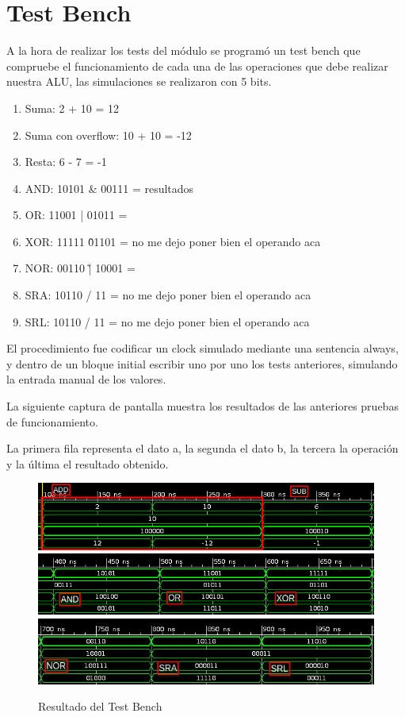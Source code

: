 \documentclass[a4paper]{article}
\begin{document}
\section{Test Bench}

A la hora de realizar los tests del módulo se programó un test bench que compruebe el funcionamiento de cada una de las operaciones que debe realizar nuestra ALU, las simulaciones se realizaron con 5 bits.

\begin{enumerate}
\item Suma: 2 + 10 = 12
\item Suma con overflow: 10 + 10 = -12
\item Resta: 6 - 7 = -1
\item AND: 10101 \& 00111 = resultados
\item OR: 11001 | 01011 = 
\item XOR: 11111 \^ 01101 = no me dejo poner bien el operando aca
\item NOR: 00110 \~| 10001 = 
\item SRA: 10110 / 11 = no me dejo poner bien el operando aca
\item SRL: 10110 / 11 = no me dejo poner bien el operando aca
\end{enumerate}

El procedimiento fue codificar un clock simulado mediante una sentencia always, y dentro de un bloque initial escribir uno por uno los tests anteriores, simulando la entrada manual de los valores.

La siguiente captura de pantalla muestra los resultados de las anteriores pruebas de funcionamiento.

La primera fila representa el dato a, la segunda el dato b, la tercera la operación y la última el resultado obtenido.


\begin{figure}[!htb]
\centering
\includegraphics[width=1\textwidth]{Suma-Resta.png}
\includegraphics[width=1\textwidth]{AND-XOR.png}
\includegraphics[width=1\textwidth]{NOR-SRL.jpg}
\caption{\label{fig:tests}Resultado del Test Bench}
\end{figure}

% 
\end{document}
